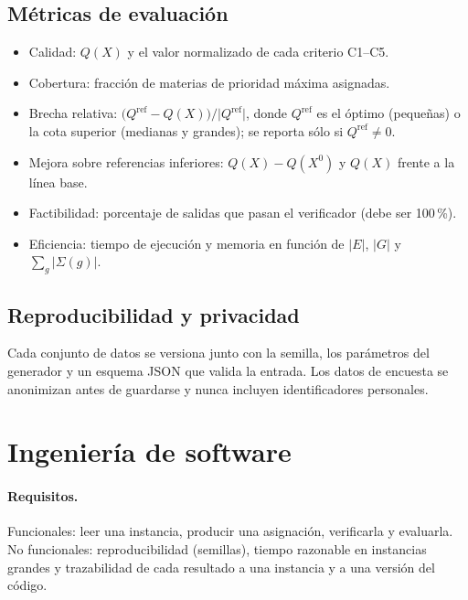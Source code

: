 \documentclass[11pt,letterpaper]{article}
\theoremstyle{definition}
\theoremstyle{remark}
\theoremstyle{plain}
\newcommand{\card}[1]{\lvert #1 \rvert}
\begin{document}
\subsection{Métricas de evaluación}
\begin{itemize}[nosep]
  \item Calidad: $Q(X)$ y el valor normalizado de cada criterio C1--C5.
  \item Cobertura: fracción de materias de prioridad máxima asignadas.
  \item Brecha relativa: $\bigl(Q^{\mathrm{ref}}-Q(X)\bigr)/\lvert Q^{\mathrm{ref}}\rvert$,
        donde $Q^{\mathrm{ref}}$ es el óptimo (pequeñas) o la cota superior
        (medianas y grandes); se reporta sólo si $Q^{\mathrm{ref}}\neq0$.
  \item Mejora sobre referencias inferiores: $Q(X)-Q(X^0)$ y $Q(X)$ frente a
        la línea base.
  \item Factibilidad: porcentaje de salidas que pasan el verificador
        (debe ser 100\,\%).
  \item Eficiencia: tiempo de ejecución y memoria en función de
        $\card{E}$, $\card{G}$ y $\sum_g\card{\Sigma(g)}$.
\end{itemize}

\subsection{Reproducibilidad y privacidad}
Cada conjunto de datos se versiona junto con la semilla, los parámetros del
generador y un esquema JSON que valida la entrada. Los datos de encuesta se
anonimizan antes de guardarse y nunca incluyen identificadores personales.

\section{Ingeniería de software}
\paragraph{Requisitos.}
Funcionales: leer una instancia, producir una asignación, verificarla y
evaluarla. No funcionales: reproducibilidad (semillas), tiempo razonable en
instancias grandes y trazabilidad de cada resultado a una instancia y a una
versión del código.
\end{document}
